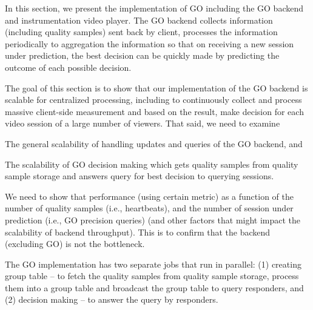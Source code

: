 In this section, we present the implementation of GO including the GO backend and instrumentation video player. The GO backend collects information (including quality samples) sent back by client, processes the information periodically to aggregation the information so that on receiving a new session under prediction, the best decision can be quickly made by predicting the outcome of each possible decision.




The goal of this section is to show that our implementation of the GO backend is scalable for centralized processing, including to continuously collect and process massive client-side measurement and based on the result, make decision for each video session of a large number of viewers. That said, we need to examine 
\begin{packeditemize}
\item The general scalability of handling updates and queries of the GO backend, and
\item The scalability of GO decision making which gets quality samples from quality sample storage and answers query for best decision to querying sessions.
\end{packeditemize}


We need to show that performance (using certain metric) as a function of the number of quality samples (i.e., heartbeats), and the number of session under prediction (i.e., GO precision queries) (and other factors that might impact the scalability of backend throughput). This is to confirm that the backend (excluding GO) is not the bottleneck.


The GO implementation has two separate jobs that run in parallel: (1) creating group table -- to fetch the quality samples from quality sample storage, process them into a group table and broadcast the group table to query responders, and (2) decision making -- to answer the query by responders. 

